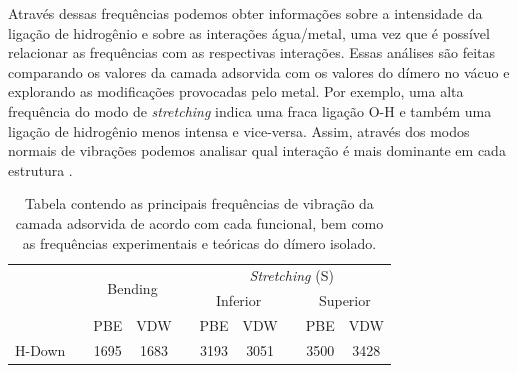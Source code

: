 Através dessas frequências podemos obter informações sobre a intensidade da ligação de hidrogênio e sobre as interações água/metal, uma vez que é possível relacionar as frequências com as respectivas interações. Essas análises são feitas comparando os valores da camada adsorvida com os valores do dímero no vácuo e explorando as modificações provocadas pelo metal. Por exemplo, uma alta frequência do modo de \textit{stretching} indica uma fraca ligação O-H e também uma ligação de hidrogênio menos intensa e vice-versa. Assim, através dos modos normais de vibrações podemos analisar qual interação é mais dominante em cada estrutura \cite{ref-modos}.
\begin{table}[b!]
	\centering
	\caption{Tabela contendo as principais frequências de vibração da camada adsorvida de acordo com cada funcional, bem como as frequências experimentais e teóricas do dímero isolado. \label{tab:freq-camada}}
	\begin{threeparttable}
		\begin{tabular}{cccccccccc} 
			\hline\hline\addlinespace[3.6pt]
			\multicolumn{10}{c}{\textbf{Frequências dos Modos Normais (cm$ ^{-1} $) - Camada de Água}}                                                                                                                                         \\ 
			\midrule
			\multirow{3}{*}{}                                                &  & \multicolumn{2}{c}{\multirow{2}{*}{Bending}} &  & \multicolumn{5}{c}{\textit{Stretching} (S)}                                                                                                                          \\
			&  & \multicolumn{2}{c}{}                         &  & \multicolumn{2}{c}{Inferior}                                               &  & \multicolumn{2}{c}{Superior}                                                \\ 
			\cmidrule{3-4}\cmidrule{6-10}
			&  & PBE  & VDW                                &  & PBE  & VDW                                                                 &  & PBE  & VDW                                                                 \\ 
			\midrule
			H-Down                                                         &  & 1695 & 1683                                  &  & 3193 & 3051                                                                &  & 3500 & 3428                                                                 \\ 
			

\end{tabular}
\end{threeparttable}
\end{table}
